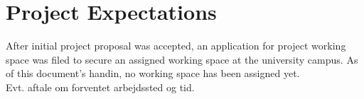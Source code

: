 \chapter{Project Expectations}
After initial project proposal was accepted, an application for project working space was filed to secure an assigned working space at the university campus. As of this document's handin, no working space has been assigned yet. \\



Evt. aftale om forventet arbejdssted og tid.